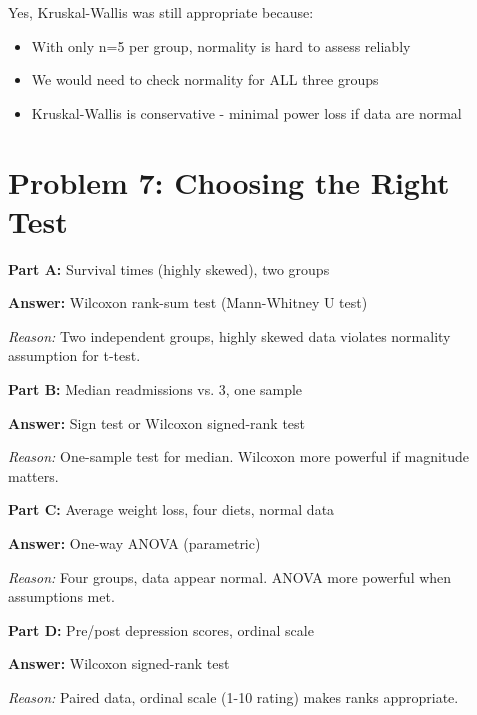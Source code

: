 \documentclass[11pt]{article}
\begin{document}
Yes, Kruskal-Wallis was still appropriate because:
\begin{itemize}
\item With only n=5 per group, normality is hard to assess reliably
\item We would need to check normality for ALL three groups
\item Kruskal-Wallis is conservative - minimal power loss if data are normal
\end{itemize}

\newpage

\section{Problem 7: Choosing the Right Test}

\textbf{Part A:} Survival times (highly skewed), two groups

\textbf{Answer:} Wilcoxon rank-sum test (Mann-Whitney U test)

\textit{Reason:} Two independent groups, highly skewed data violates normality assumption for t-test.

\vspace{6pt}

\textbf{Part B:} Median readmissions vs. 3, one sample

\textbf{Answer:} Sign test or Wilcoxon signed-rank test

\textit{Reason:} One-sample test for median. Wilcoxon more powerful if magnitude matters.

\vspace{6pt}

\textbf{Part C:} Average weight loss, four diets, normal data

\textbf{Answer:} One-way ANOVA (parametric)

\textit{Reason:} Four groups, data appear normal. ANOVA more powerful when assumptions met.

\vspace{6pt}

\textbf{Part D:} Pre/post depression scores, ordinal scale

\textbf{Answer:} Wilcoxon signed-rank test

\textit{Reason:} Paired data, ordinal scale (1-10 rating) makes ranks appropriate.
\end{document}
